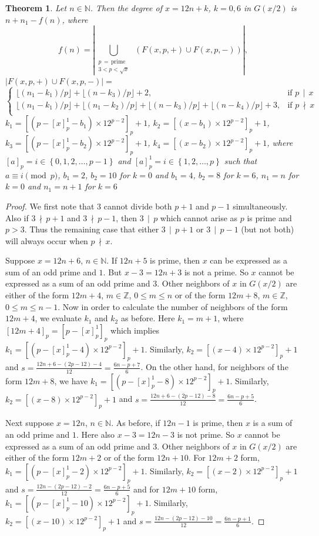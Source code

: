 \documentclass[11pt]{article}
\newtheorem{theorem}{Theorem}[section]
\theoremstyle{definition}
\theoremstyle{remark}
\numberwithin{equation}{section}
\newcommand{\Nat}{\mathbb{N}}
\newcommand{\Int}{\mathbb{Z}}
\newcommand{\set}[1]{\left\{#1\right\}}
\newcommand{\Mod}[3]{#1\equiv #2 \pmod{#3}}
\newcommand{\Div}[2]{#1\,\mid\, #2}
\newcommand{\nDiv}[2]{#1\,\nmid\, #2}
\begin{document}
\begin{theorem}\label{thm612}
Let $n\in\Nat$. Then the degree of $x=12n+k$, $k=0,6$ in $G(x/2)$ is $n+n_1-f(n)$, where
$$f(n)=|\bigcup\limits_{\substack{p\, =\, \text{prime}\\ 3< p<\sqrt{x}}} \ \left(F(x,p,+)\cup F(x,p,-)\right)|,$$
$|F(x,p,+)\cup F(x,p,-)|=$
{\footnotesize $$\left\{\begin{array}{ll}
\lfloor (n_1-k_1)/p\rfloor+\lfloor (n-k_3)/p\rfloor+2, & \text{if } \Div{p}{x}\\
\lfloor (n_1-k_1)/p\rfloor + \lfloor (n_1-k_2)/p\rfloor +\lfloor (n-k_3)/p\rfloor + \lfloor (n-k_4)/p\rfloor +3, & \text{if } \nDiv{p}{x}\\
\end{array}\right.$$}
$k_1=[(p-[x]_p^1-b_1)\times 12^{p-2}]_p+1$, $k_2=[(x-b_1)\times 12^{p-2}]_p+1$, $k_3=[(p-[x]_p^1-b_2)\times 12^{p-2}]_p+1$, $k_4=[(x-b_2)\times 12^{p-2}]_p+1$, where $[a]_p=i\in\set{0,1,2,\ldots,p-1}$ and $[a]_p^1=i\in\set{1,2,\ldots,p}$ such that $\Mod{a}{i}{p}$, $b_1=2$, $b_2=10$ for $k=0$ and $b_1=4$, $b_2=8$ for $k=6$, $n_1=n$ for $k=0$ and $n_1=n+1$ for $k=6$ 
\end{theorem}

\begin{proof}
We first note that $3$ cannot divide both $p+1$ and $p-1$ simultaneously. Also if $\nDiv{3}{p+1}$ and $\nDiv{3}{p-1}$, then $\Div{3}{p}$ which cannot arise as $p$ is prime and $p>3$. Thus the remaining case that either $\Div{3}{p+1}$ or $\Div{3}{p-1}$ (but not both) will always occur when $\nDiv{p}{x}$.

\vspace{1em}
\noindent
Suppose $x=12n+6$, $n\in\Nat$. If $12n+5$ is prime, then $x$ can be expressed as a sum of an odd prime and $1$. But $x-3=12n+3$ is not a prime. So $x$ cannot be expressed as a sum of an odd prime and $3$. Other neighbors of $x$ in $G(x/2)$ are either of the form $12m+4$, $m\in\Int$, $0\leq m\leq n$ or of the form $12m+8$, $m\in\Int$, $0\leq m\leq n-1$. Now in order to calculate the number of neighbors of the form $12m+4$, we evaluate $k_1$ and $k_2$ as before. Here $k_1=m+1$, where $[12m+4]_p=[p-[x]_p^1]_p$ which implies $k_1=[(p-[x]_p^1-4)\times 12^{p-2}]_p+1$. Similarly, $k_2=[(x-4)\times 12^{p-2}]_p+1$ and $s=\frac{12n+6-(2p-12)-4}{12}=\frac{6n-p+7}{6}$. On the other hand, for neighbors of the form $12m+8$, we have $k_1=[(p-[x]_p^1-8)\times 12^{p-2}]_p+1$. Similarly, $k_2=[(x-8)\times 12^{p-2}]_p+1$ and $s=\frac{12n+6-(2p-12)-8}{12}=\frac{6n-p+5}{6}$.

\vspace{1em}
\noindent
Next suppose $x=12n$, $n\in\Nat$. As before, if $12n-1$ is prime, then $x$ is a sum of an odd prime and $1$. Here also $x-3=12n-3$ is not prime. So $x$ cannot be expressed as a sum of an odd prime and $3$. Other neighbors of $x$ in $G(x/2)$ are either of the form $12m+2$ or of the form $12n+10$. For $12m+2$ form, $k_1=[(p-[x]_p^1-2)\times 12^{p-2}]_p+1$. Similarly, $k_2=[(x-2)\times 12^{p-2}]_p+1$ and $s=\frac{12n-(2p-12)-2}{12}=\frac{6n-p+5}{6}$ and for $12m+10$ form, $k_1=[(p-[x]_p^1-10)\times 12^{p-2}]_p+1$. Similarly, $k_2=[(x-10)\times 12^{p-2}]_p+1$ and $s=\frac{12n-(2p-12)-10}{12}=\frac{6n-p+1}{6}$.
\end{proof}
\end{document}
